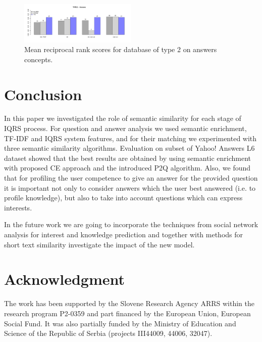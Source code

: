 \documentclass[conference]{IEEEtran}
\begin{document}
\begin{figure}[!t]
	\setlength{\belowcaptionskip}{-15pt}
	\setlength{\abovecaptionskip}{-10pt}
	\centering
	\includegraphics[width=0.5\textwidth]{mrrType2Answers.pdf}
	\caption{Mean reciprocal rank scores for database of type 2 on answers concepts.}
	\label{fig:mrrtype2}
\end{figure}
\vspace{-0.3cm}
\section{Conclusion}
\label{sec:conclusion}
In this paper we investigated the role of semantic similarity for each stage of IQRS process. For question and answer analysis we used semantic enrichment, TF-IDF and IQRS system features, and for their matching we experimented with three semantic similarity algorithms. Evaluation on subset of Yahoo! Answers L6 dataset showed that the best results are obtained by using semantic enrichment with proposed CE approach and the introduced P2Q algorithm. Also, we found that for profiling the user competence to give an answer for the provided question it is important not only to consider answers which the user best answered (i.e. to profile knowledge), but also to take into account  questions which can express interests.

In the future work we are going to incorporate the techniques from social network analysis for interest and knowledge prediction and together with methods for short text similarity investigate the impact of the new model.






\vspace{-0.3cm}
\section*{Acknowledgment}
The work has been supported by the Slovene Research Agency ARRS within the research program P2-0359 and part financed by the European Union, European Social Fund. It was also partially funded by the Ministry of Education and Science of the Republic of Serbia (projects III44009, 44006, 32047).
\end{document}
